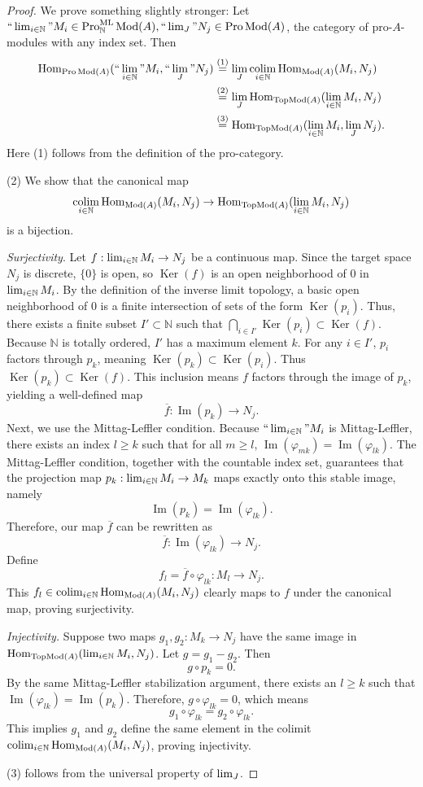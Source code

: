 \documentclass[10pt,a4paper]{amsart}
\newcommand{\Hom}{\operatorname{Hom}}
\renewcommand{\Im}{\operatorname{Im}}
\newcommand{\Ker}{\operatorname{Ker}}
\newcommand{\ML}{\operatorname{ML}}
\newcommand{\Mod}{\operatorname{Mod}}
\newcommand{\N}{\mathbb{N}}
\newcommand{\Pro}{\operatorname{Pro}}
\newcommand{\TopMod}{\operatorname{TopMod}}
\renewcommand{\bar}{\overline}
\newcommand{\colim}{\operatornamewithlimits{\rm{colim}}}
\renewcommand{\lim}{\operatornamewithlimits{\rm{lim}}}
\renewcommand{\phi}{{\varphi}}
\newcommand{\ra}{\rightarrow} %
\begin{document}
\begin{proof}
We prove something slightly stronger:
Let $``\lim_{i\in \N}" M_i\in \Pro^{\ML}_{\N}\Mod(A), ``\lim_J" N_j\in \Pro\Mod(A)$, the category of pro-$A$-modules with any index set. Then
\begin{align*} 
\Hom_{\Pro\Mod(A)}(``\lim_{i\in \N}" M_i,``\lim_J"N_j)
&\stackrel{(1)}{=}\lim_J \colim_{i\in \N} \Hom_{\Mod(A)}(M_i,N_j)
\\
&\stackrel{(2)}{=}\lim_J \Hom_{\TopMod(A)}(\lim_{i\in \N} M_i,N_j)\\
&\stackrel{(3)}{=}\Hom_{\TopMod(A)}(\lim_{i\in \N} M_i,\lim_J N_j).
\end{align*}
Here 
(1) follows from the definition of the pro-category.     

(2) 
We show that the canonical map 
$$\colim_{i\in \N} \Hom_{\Mod(A)}(M_i, N_j) \to \Hom_{\TopMod(A)}(\lim_{i\in \N} M_i, N_j)$$
is a bijection.

\textit{Surjectivity}.
Let $f: \lim_{i\in \N} M_i \to N_j$ be a continuous map. Since the target space $N_j$ is discrete, $\{0\}$ is open, so $\Ker(f)$ is an open neighborhood of $0$ in $\lim_{i\in \N} M_i$. 
By the definition of the inverse limit topology, a basic open neighborhood of $0$ is a finite intersection of sets of the form $\Ker(p_i)$. Thus, there exists a finite subset $I' \subset \N$ such that $\bigcap_{i \in I'} \Ker(p_i) \subset \Ker(f)$. Because $\N$ is totally ordered, $I'$ has a maximum element $k$. For any $i \in I'$, $p_i$ factors through $p_k$, meaning $\Ker(p_k) \subset \Ker(p_i)$. Thus $\Ker(p_k) \subset \Ker(f)$.
This inclusion means $f$ factors through the image of $p_k$, yielding a well-defined map 
$$\bar{f}: \Im(p_k) \to N_j.$$
Next, we use the Mittag-Leffler condition. Because $``\lim_{i\in \N}" M_i$ is Mittag-Leffler, there exists an index $l \ge k$ such that for all $m \ge l$, $\Im(\phi_{mk}) = \Im(\phi_{lk})$. 
The Mittag-Leffler condition, together with the countable index set, guarantees that the 
projection map $p_k:\lim_{i\in \N} M_i\ra M_k$ maps
exactly onto this stable image, namely 
$$\Im(p_k) = \Im(\phi_{lk}).$$
Therefore, our map $\bar{f}$ can be rewritten as
$$\bar f: \Im(\phi_{lk}) \ra N_j.$$
Define
$$f_l = \bar{f} \circ \phi_{lk}: M_l \to N_j.$$
This $f_l\in \colim_{i\in \N} \Hom_{\Mod(A)}(M_i, N_j)$ clearly maps to $f$ under the canonical map, proving surjectivity.


\textit{Injectivity.}
Suppose two maps $g_1, g_2: M_k \to N_j$ have the same image in $\Hom_{\TopMod(A)}(\lim_{i\in \N} M_i, N_j)$. Let $g = g_1 - g_2$. Then 
$$g \circ p_k = 0.$$
By the same Mittag-Leffler stabilization argument, there exists an $l \ge k$ such that $\Im(\phi_{lk}) = \Im(p_k)$. 
Therefore, $g \circ \phi_{lk} = 0$, which means 
$$g_1 \circ \phi_{lk} = g_2 \circ \phi_{lk}.$$
This implies $g_1$ and $g_2$ define the same element in the colimit $\colim_{i\in \N} \Hom_{\Mod(A)}(M_i, N_j)$, proving injectivity.

(3)
follows from the universal property of $\lim_J$.

\end{proof}
\end{document}
